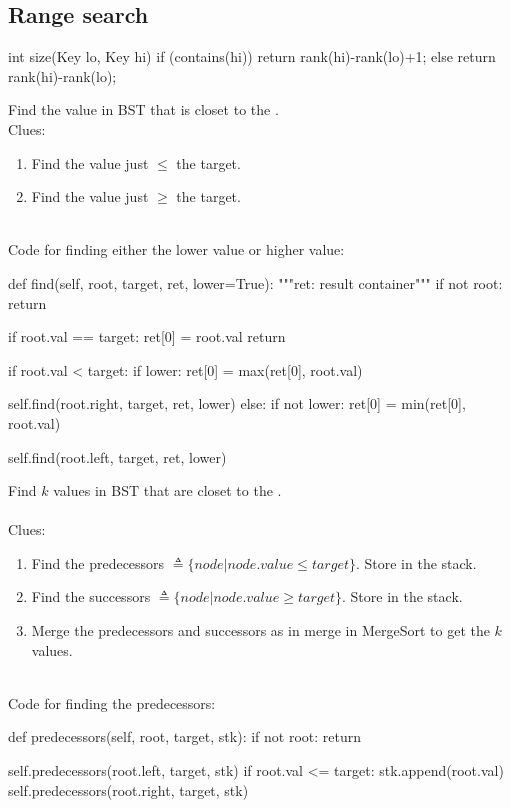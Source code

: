 \subsection{Range search}
\begin{java}
int size(Key lo, Key hi) {
    if (contains(hi)) return rank(hi)-rank(lo)+1;
    else              return rank(hi)-rank(lo);
}
\end{java}

 Find the value in BST that is closet to the .
\\
Clues:
\begin{enumerate}
\item Find the value just $\leq$ the target.
\item Find the value just $\geq$ the target.
\end{enumerate}
\
\\
Code for finding either the lower value or higher value:
\begin{python}
def find(self, root, target, ret, lower=True):
  """ret: result container"""
  if not root: return

  if root.val == target:
    ret[0] = root.val
    return

  if root.val < target:
    if lower:
      ret[0] = max(ret[0], root.val)

    self.find(root.right, target, ret, lower)
  else:
    if not lower:
      ret[0] = min(ret[0], root.val)

    self.find(root.left, target, ret, lower)
\end{python}

 Find $k$ values in BST that are closet to the .
\\\\
Clues:
\begin{enumerate}
\item Find the predecessors $\triangleq \{node | node.value \leq target\}$. Store in the stack. 
\item Find the successors $\triangleq \{node | node.value \geq target\}$. Store in the stack.
\item Merge the predecessors and successors as in merge in MergeSort to get the $k$ values. 
\end{enumerate}
\
\\
Code for finding the predecessors:
\begin{python}
def predecessors(self, root, target, stk):
  if not root: return

  self.predecessors(root.left, target, stk)
  if root.val <= target:
    stk.append(root.val)
    self.predecessors(root.right, target, stk)
\end{python}


